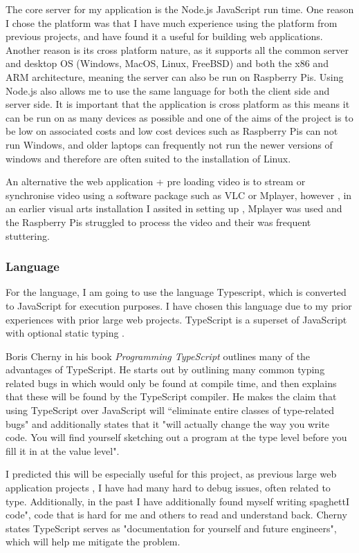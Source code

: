 \documentclass{article}
\begin{document}
The core server for my application is the Node.js JavaScript run time. One reason I chose the platform was that I have much experience using the platform from previous projects, and have found it a useful for building web applications. Another reason is its cross platform nature, as it supports all the common server and desktop OS (Windows, MacOS, Linux, FreeBSD) and both the x86 and ARM architecture, meaning the server can also be run on Raspberry Pis. Using Node.js also allows me to use the same language for both the client side and server side. It is important that the application is cross platform as this means it can be run on as many devices as possible and one of the aims of the project is to be low on associated costs and low cost devices such as Raspberry Pis can not run Windows, and older laptops can frequently not run the newer versions of windows and therefore are often suited to the installation of Linux.

An alternative the web application + pre loading video is to stream or synchronise video using a software package such as VLC or Mplayer, however , in an earlier visual arts installation I assited in setting up \cite{friend_2021}, Mplayer was used and the Raspberry Pis struggled to process the video and their was frequent stuttering. 

\subsubsection{Language}
For the language, I am going to use the language Typescript, which is converted to JavaScript for execution purposes. I have chosen this language due to my prior experiences with prior large web projects. TypeScript is a superset of JavaScript with optional static typing \cite{typescript}. 

Boris Cherny in his book \textit{Programming TypeScript} outlines many of the advantages of TypeScript. He starts out by  outlining many common typing related bugs in which would only be found at compile time, and then explains that these will be found by the TypeScript compiler. He makes the claim that using TypeScript over JavaScript will ``eliminate entire classes of type-related bugs" and additionally states that it "will actually change the way you write code. You will find yourself sketching out a program at the type level before you fill it in at the value level"\cite{cherny_2019}. 

I predicted this will be especially useful for this project, as previous large web application projects , I have had many hard to debug issues, often related to type. Additionally, in the past I have additionally found myself writing spaghettI code", code that is hard for me and others to read and understand back. Cherny states TypeScript serves as "documentation for yourself and future engineers", which will help me mitigate the problem.
\end{document}
